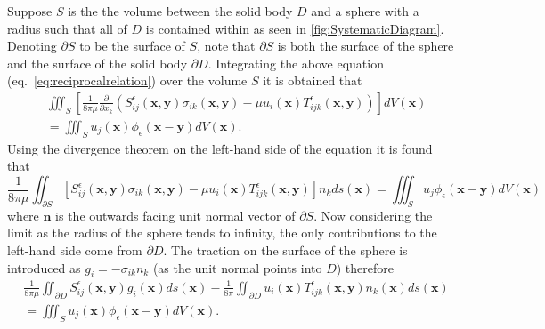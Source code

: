 Suppose $S$ is the the volume between the solid body $D$ and a sphere with a radius such that all of $D$ is contained within as seen in \cref{fig:SystematicDiagram}. Denoting $\partial S$ to be the surface of $S$, note that $\partial S$ is both the surface of the sphere and the surface of the solid body $\partial D$. Integrating the above equation (eq.~\ref{eq:reciprocalrelation}) over the volume $S$ it is obtained that
\begin{equation*}
\begin{aligned}
      &\iiint_{S} \left[\frac{1}{8\pi\mu}\frac{\partial}{\partial x_k}(S^\epsilon_{ij}\left(\bm{x}, \bm{y}\right)\sigma_{ik}\left(\bm{x}, \bm{y}\right) - \mu u_i(\bm{x}) T^\epsilon_{ijk}\left(\bm{x}, \bm{y}\right))\right] dV(\bm{x}) \\
      &= \iiint_{S} u_j(\bm{x})\phi_\epsilon(\bm{x}-\bm{y}) dV(\bm{x}).
\end{aligned}
\end{equation*}
Using the divergence theorem on the left-hand side of the equation it is found that
\begin{equation*}
  \frac{1}{8\pi\mu}\iint_{\partial S} \left[S^\epsilon_{ij}\left(\bm{x}, \bm{y}\right)\sigma_{ik}\left(\bm{x}, \bm{y}\right) - \mu u_i(\bm{x}) T^\epsilon_{ijk}\left(\bm{x}, \bm{y}\right)\right]n_k ds(\bm{x}) = \iiint_{S} u_j\phi_\epsilon(\bm{x}-\bm{y}) dV(\bm{x})
\end{equation*}
where $\bm{n}$ is the outwards facing unit normal vector of $\partial S$. Now considering the limit as the radius of the sphere tends to infinity, the only contributions to the left-hand side come from $\partial D$. The traction on the surface of the sphere is introduced as $g_{i} = -\sigma_{ik}n_k$ (as the unit normal points into $D$) therefore
\begin{equation}
\begin{aligned}
    \label{eq:BIE3}
    &\frac{1}{8\pi\mu}\iint_{\partial D} S^\epsilon_{ij}\left(\bm{x}, \bm{y}\right)g_i(\bm{x}) ds(\bm{x}) - \frac{1}{8\pi}\iint_{\partial D} u_i(\bm{x}) T^\epsilon_{ijk}\left(\bm{x}, \bm{y}\right)n_k(\bm{x}) ds(\bm{x}) \\
    &= \iiint_{S} u_j(\bm{x})\phi_\epsilon(\bm{x}-\bm{y}) dV(\bm{x}).
\end{aligned}
\end{equation}

